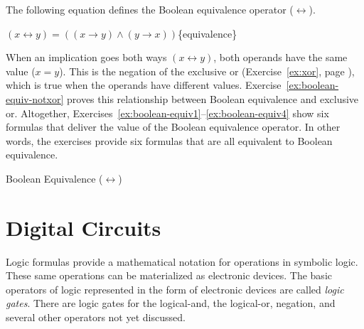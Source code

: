 \begin{aside}
The following equation defines the
Boolean equivalence operator ($\leftrightarrow$).
\vspace{1mm}
\begin{center}
$(x \leftrightarrow y) = ((x \rightarrow y) \wedge (y \rightarrow x))$\hspace{5mm}\{equivalence\}
\end{center}
\vspace{1mm}
\noindent When an implication goes both ways $(x \leftrightarrow y)$,
both operands have the same value ($x = y$).
This is the negation of the
exclusive or
(Exercise~\ref{ex:xor}, page \pageref{ex:xor}),
which is true when the operands have different values.
Exercise~\ref{ex:boolean-equiv-notxor} proves this relationship
between Boolean equivalence and exclusive or.
Altogether,
Exercises~\ref{ex:boolean-equiv1}--\ref{ex:boolean-equiv4}
show six formulas that deliver the value of the Boolean equivalence operator.
In other words, the exercises provide six formulas that are all equivalent to
Boolean equivalence.
\caption{Boolean Equivalence ($\leftrightarrow$)}
\label{aside:boolean-equivlance}\label{def:equivalence-op}
\end{aside}

\section{Digital Circuits}
\label{sec:digital-circuits}

Logic formulas provide a mathematical notation for operations in symbolic logic.
These same operations can be materialized as electronic devices.
The basic operators of logic represented in the form of electronic devices
are called \emph{logic gates}.
There are logic
gates
for the logical-and, the logical-or, negation, and
several other operators not yet discussed.

